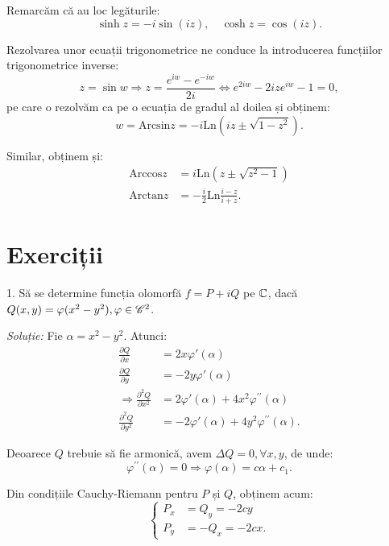 Remarcăm că au loc legăturile:
\[
  \sinh z = -i\sin(iz), \quad \cosh z = \cos(iz).
\]

Rezolvarea unor ecuații trigonometrice ne conduce la introducerea
funcțiilor trigonometrice inverse:
\[
  z = \sin w \Rightarrow z = \frac{e^{iw} - e^{-iw}}{2i} \Leftrightarrow %
  e^{2iw} - 2ize^{iw} - 1 = 0,
\]
pe care o rezolvăm ca pe o ecuația de gradul al doilea și obținem:
\[
  w = \mathrm{Arcsin}z = -i\mathrm{Ln}(iz \pm \sqrt{1 - z^2}).
\]

Similar, obținem și:
\begin{align*}
  \mathrm{Arccos}z &= i\mathrm{Ln}(z \pm \sqrt{z^2 - 1}) \\
  \mathrm{Arctan}z &= -\frac{i}{2}\mathrm{Ln}\frac{i - z}{i + z}.
\end{align*}



\section{Exerciții}

1. Să se determine funcția olomorfă $ f = P + iQ $ pe $ \mathbb{C} $, dacă
$ Q(x, y) = \varphi(x^2 - y^2), \varphi \in \mathscr{C}^2 $.

\emph{Soluție:} Fie $ \alpha = x^2 - y^2 $. Atunci:
\begin{align*}
  \frac{\partial Q}{\partial x} &= 2x\varphi'(\alpha) \\
  \frac{\partial Q}{\partial y} &= -2y\varphi'(\alpha) \\
  \Rightarrow \frac{\partial^2 Q}{\partial x^2} &= 2\varphi'(\alpha) + %
                                                  4x^2 \varphi^{\prime\prime}(\alpha) \\
  \frac{\partial^2 Q}{\partial y^2} &= -2\varphi'(\alpha) + 4y^2\varphi^{\prime\prime}(\alpha).
\end{align*}

Deoarece $ Q $ trebuie să fie armonică, avem $ \Delta Q = 0, \forall x, y $, de unde:
\[
  \varphi^{\prime\prime}(\alpha) = 0 \Rightarrow \varphi(\alpha) = c\alpha + c_1.
\]

Din condițiile Cauchy-Riemann pentru $ P $ și $ Q $, obținem acum:
\[
  \begin{cases}
    P_x &= Q_y = -2cy \\
    P_y &= -Q_x = -2cx.
  \end{cases}
\]

